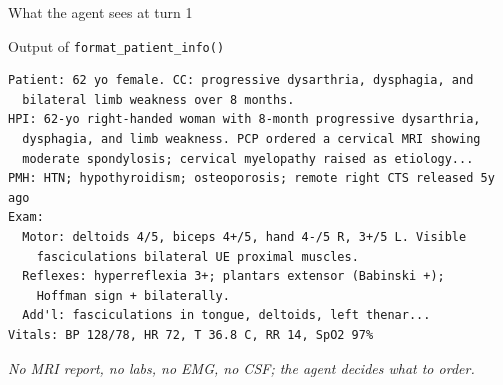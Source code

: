 \documentclass[aspectratio=169,t]{beamer}
\begin{document}
\begin{frame}[fragile]{What the agent sees at turn 1}
  \scriptsize
  \begin{exampleblock}{Output of \texttt{format\_patient\_info()}}
  \begin{lstlisting}
Patient: 62 yo female. CC: progressive dysarthria, dysphagia, and
  bilateral limb weakness over 8 months.
HPI: 62-yo right-handed woman with 8-month progressive dysarthria,
  dysphagia, and limb weakness. PCP ordered a cervical MRI showing
  moderate spondylosis; cervical myelopathy raised as etiology...
PMH: HTN; hypothyroidism; osteoporosis; remote right CTS released 5y ago
Exam:
  Motor: deltoids 4/5, biceps 4+/5, hand 4-/5 R, 3+/5 L. Visible
    fasciculations bilateral UE proximal muscles.
  Reflexes: hyperreflexia 3+; plantars extensor (Babinski +);
    Hoffman sign + bilaterally.
  Add'l: fasciculations in tongue, deltoids, left thenar...
Vitals: BP 128/78, HR 72, T 36.8 C, RR 14, SpO2 97%
  \end{lstlisting}
  \end{exampleblock}

  \centering\scriptsize\itshape
  No MRI report, no labs, no EMG, no CSF; the agent decides what to order.
\end{frame}
\end{document}
